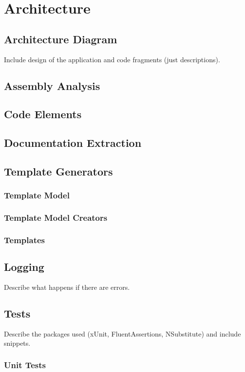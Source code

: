 \chapter{Architecture}

\section{Architecture Diagram}
Include design of the application and code fragments (just descriptions).

\section{Assembly Analysis}
\section{Code Elements}
\section{Documentation Extraction}
\section{Template Generators}
\subsection{Template Model}
\subsection{Template Model Creators}
\subsection{Templates}

\section{Logging}
Describe what happens if there are errors.

\section{Tests}
Describe the packages used (xUnit, FluentAssertions, NSubstitute) and include snippets.

\subsection{Unit Tests}
